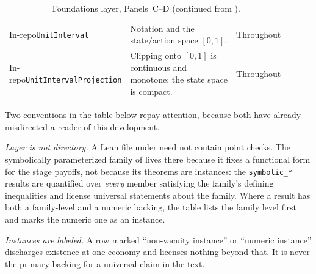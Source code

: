 \begin{table}[p]
\begin{tabular}{@{}p{0.30\linewidth}p{0.42\linewidth}p{0.20\linewidth}@{}}
\addlinespace[2pt]
In-repo\newline\texttt{UnitInterval}
& Notation and the state/action space $[0,1]$.
& Throughout\\
\addlinespace[2pt]
In-repo\newline\texttt{UnitIntervalProjection}
& Clipping onto $[0,1]$ is continuous and monotone; the state space is compact.
& Throughout\\
\bottomrule
\end{tabular}
\caption{Foundations layer, Panels~C--D (continued from
).}
\label{tab:formalized-theory-cont}
\end{table}

\noindent
Two conventions in the table below repay attention, because both have
already misdirected a reader of this development.

\emph{Layer is not directory.}  A Lean file under  need not
contain point checks.  The symbolically parameterized family of
 lives there because it fixes a functional form
for the stage payoffs, not because its theorems are instances: the
\texttt{symbolic\_*} results are quantified over \emph{every} member
satisfying the family's defining inequalities and license universal
statements about the family.  Where a result
has both a family-level and a numeric backing, the table lists the family
level first and marks the numeric one as an instance.

\emph{Instances are labeled.}  A row marked ``non-vacuity instance'' or
``numeric instance'' discharges existence at one economy and licenses
nothing beyond that.  It is never the primary backing for a universal
claim in the text.

